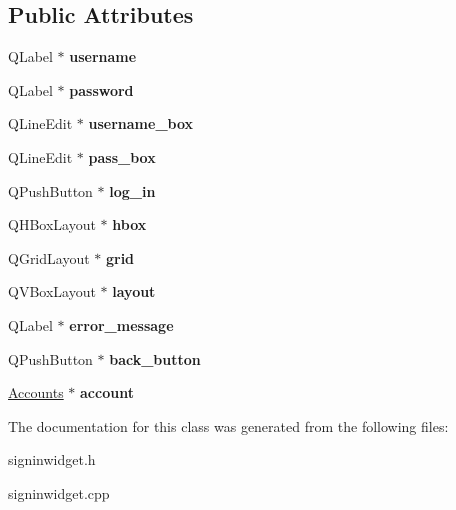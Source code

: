 \subsection*{Public Attributes}
\begin{DoxyCompactItemize}
\item 
\mbox{\label{classSignInWidget_aa8aa08d2074b88a76c27a4a8d2cb30aa}} 
Q\+Label $\ast$ {\bfseries username}
\item 
\mbox{\label{classSignInWidget_aecae7b246e3e4b8ee92d7766fcd2cbb4}} 
Q\+Label $\ast$ {\bfseries password}
\item 
\mbox{\label{classSignInWidget_a285d85bf5a50682092ebeae4b649a6bf}} 
Q\+Line\+Edit $\ast$ {\bfseries username\+\_\+box}
\item 
\mbox{\label{classSignInWidget_a9d7aea24e354e02199cd291b315468d9}} 
Q\+Line\+Edit $\ast$ {\bfseries pass\+\_\+box}
\item 
\mbox{\label{classSignInWidget_adee8b382dec358f91247e645088a31c4}} 
Q\+Push\+Button $\ast$ {\bfseries log\+\_\+in}
\item 
\mbox{\label{classSignInWidget_ac4e539c190d9286fac1c7f13e3f22221}} 
Q\+H\+Box\+Layout $\ast$ {\bfseries hbox}
\item 
\mbox{\label{classSignInWidget_a9431b22556c5dde79aa7bb709e3668e9}} 
Q\+Grid\+Layout $\ast$ {\bfseries grid}
\item 
\mbox{\label{classSignInWidget_aa644ac4a70d186c4dccbc9c0d4d95119}} 
Q\+V\+Box\+Layout $\ast$ {\bfseries layout}
\item 
\mbox{\label{classSignInWidget_abaae0b61c094b30dce2b717cce615a6d}} 
Q\+Label $\ast$ {\bfseries error\+\_\+message}
\item 
\mbox{\label{classSignInWidget_a22d3a8059947b3354c39dde4206d9cf4}} 
Q\+Push\+Button $\ast$ {\bfseries back\+\_\+button}
\item 
\mbox{\label{classSignInWidget_a17c131cc2537ccb3f6962b567ad30c51}} 
\hyperlink{classAccounts}{Accounts} $\ast$ {\bfseries account}
\end{DoxyCompactItemize}


The documentation for this class was generated from the following files\+:\begin{DoxyCompactItemize}
\item 
signinwidget.\+h\item 
signinwidget.\+cpp\end{DoxyCompactItemize}
